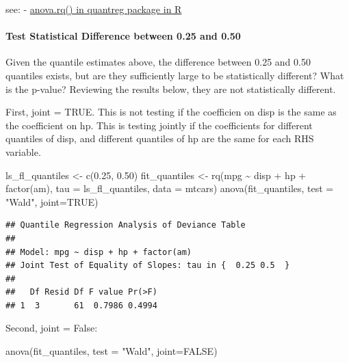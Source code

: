 \documentclass[
]{book}
\newenvironment{Shaded}{\begin{snugshade}}{\end{snugshade}}
\newcommand{\AttributeTok}[1]{\textcolor[rgb]{0.77,0.63,0.00}{#1}}
\newcommand{\ConstantTok}[1]{\textcolor[rgb]{0.00,0.00,0.00}{#1}}
\newcommand{\FloatTok}[1]{\textcolor[rgb]{0.00,0.00,0.81}{#1}}
\newcommand{\FunctionTok}[1]{\textcolor[rgb]{0.00,0.00,0.00}{#1}}
\newcommand{\NormalTok}[1]{#1}
\newcommand{\OtherTok}[1]{\textcolor[rgb]{0.56,0.35,0.01}{#1}}
\newcommand{\SpecialCharTok}[1]{\textcolor[rgb]{0.00,0.00,0.00}{#1}}
\newcommand{\StringTok}[1]{\textcolor[rgb]{0.31,0.60,0.02}{#1}}
\begin{document}
see:
- \href{https://stackoverflow.com/questions/32743758/anova-rq-in-quantreg-package-in-r}{anova.rq() in quantreg package in R}

\hypertarget{test-statistical-difference-between-0.25-and-0.50}{%
\paragraph{Test Statistical Difference between 0.25 and 0.50}\label{test-statistical-difference-between-0.25-and-0.50}}

Given the quantile estimates above, the difference between 0.25 and 0.50 quantiles exists, but are they sufficiently large to be statistically different? What is the p-value? Reviewing the results below, they are not statistically different.

First, joint = TRUE. This is not testing if the coefficien on disp is the same as the coefficient on hp. This is testing jointly if the coefficients for different quantiles of disp, and different quantiles of hp are the same for each RHS variable.

\begin{Shaded}
\begin{Highlighting}[]
\NormalTok{ls\_fl\_quantiles }\OtherTok{\textless{}{-}} \FunctionTok{c}\NormalTok{(}\FloatTok{0.25}\NormalTok{, }\FloatTok{0.50}\NormalTok{)}
\NormalTok{fit\_quantiles }\OtherTok{\textless{}{-}} \FunctionTok{rq}\NormalTok{(mpg }\SpecialCharTok{\textasciitilde{}}\NormalTok{ disp }\SpecialCharTok{+}\NormalTok{ hp }\SpecialCharTok{+} \FunctionTok{factor}\NormalTok{(am),}
               \AttributeTok{tau =}\NormalTok{ ls\_fl\_quantiles,}
               \AttributeTok{data =}\NormalTok{ mtcars)}
\FunctionTok{anova}\NormalTok{(fit\_quantiles, }\AttributeTok{test =} \StringTok{"Wald"}\NormalTok{, }\AttributeTok{joint=}\ConstantTok{TRUE}\NormalTok{)}
\end{Highlighting}
\end{Shaded}

\begin{verbatim}
## Quantile Regression Analysis of Deviance Table
## 
## Model: mpg ~ disp + hp + factor(am)
## Joint Test of Equality of Slopes: tau in {  0.25 0.5  }
## 
##   Df Resid Df F value Pr(>F)
## 1  3       61  0.7986 0.4994
\end{verbatim}

Second, joint = False:

\begin{Shaded}
\begin{Highlighting}[]
\FunctionTok{anova}\NormalTok{(fit\_quantiles, }\AttributeTok{test =} \StringTok{"Wald"}\NormalTok{, }\AttributeTok{joint=}\ConstantTok{FALSE}\NormalTok{)}
\end{Highlighting}
\end{Shaded}
\end{document}

